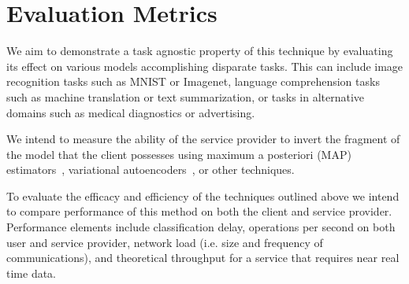 \section{Evaluation Metrics}

We aim to demonstrate a task agnostic property of this technique by evaluating its effect 
on various models accomplishing disparate tasks. This can include image recognition tasks
such as MNIST or Imagenet, language comprehension tasks such as machine translation or 
text summarization, or tasks in alternative domains such as medical diagnostics or advertising.

We intend to measure the ability of the service provider to invert the fragment of the model 
that the client possesses using maximum a posteriori (MAP) estimators~\cite{fredrikson2015model}, 
variational autoencoders~\cite{doersch2016tutorial}, or other techniques.

To evaluate the efficacy and efficiency of the techniques outlined above we intend to compare
performance of this method on both the client and service provider. Performance elements include
classification delay, operations per second on both user and service provider, network 
load (i.e. size and frequency of communications), and theoretical throughput for a service 
that requires near real time data. 